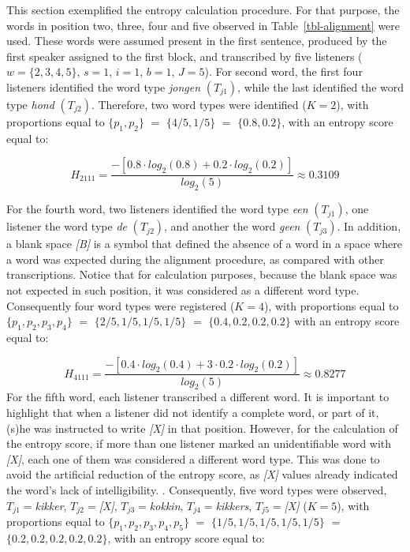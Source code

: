 \documentclass[
  authoryear,
  preprint,
  1p]{elsarticle}
\begin{document}
This section exemplified the entropy calculation procedure. For that
purpose, the words in position two, three, four and five observed in
Table~\ref{tbl-alignment} were used. These words were assumed present in
the first sentence, produced by the first speaker assigned to the first
block, and transcribed by five listeners (\(w=\{2,3,4,5\}\), \(s=1\),
\(i=1\), \(b=1\), \(J=5\)). For second word, the first four listeners
identified the word type \emph{jongen} \((T_{j1})\), while the last
identified the word type \emph{hond} \((T_{j2})\). Therefore, two word
types were identified (\(K=2\)), with proportions equal to
\(\{ p_{1}, p_{2} \}\) \(=\) \(\{ 4/5, 1/5 \}\) \(=\)
\(\{ 0.8, 0.2 \}\), with an entropy score equal to:

\[ 
H_{2111} = \frac{ -\left[ 0.8 \cdot log_{2}(0.8) + 0.2 \cdot log_{2}(0.2) \right] }{ log_{2}(5)} \approx 0.3109
\]

For the fourth word, two listeners identified the word type \emph{een}
\((T_{j1})\), one listener the word type \emph{de} \((T_{j2})\), and
another the word \emph{geen} \((T_{j3})\). In addition, a blank space
\emph{{[}B{]}} is a symbol that defined the absence of a word in a space
where a word was expected during the alignment procedure, as compared
with other transcriptions. Notice that for calculation purposes, because
the blank space was not expected in such position, it was considered as
a different word type. Consequently four word types were registered
(\(K=4\)), with proportions equal to
\(\{ p_{1}, p_{2}, p_{3}, p_{4} \}\) \(=\) \(\{ 2/5, 1/5, 1/5, 1/5 \}\)
\(=\) \(\{ 0.4, 0.2, 0.2, 0.2 \}\) with an entropy score equal to:

\[ 
H_{4111} = \frac{ -\left[ 0.4 \cdot log_{2}(0.4) + 3 \cdot 0.2 \cdot log_{2}(0.2) \right] }{ log_{2}(5)} \approx 0.8277
\] For the fifth word, each listener transcribed a different word. It is
important to highlight that when a listener did not identify a complete
word, or part of it, (s)he was instructed to write \emph{{[}X{]}} in
that position. However, for the calculation of the entropy score, if
more than one listener marked an unidentifiable word with
\emph{{[}X{]}}, each one of them was considered a different word type.
This was done to avoid the artificial reduction of the entropy score, as
\emph{{[}X{]}} values already indicated the word's lack of
intelligibility. . Consequently, five word types were observed,
\(T_{j1}=\)\emph{kikker}, \(T_{j2}=\)\emph{{[}X{]}},
\(T_{j3}=\)\emph{kokkin}, \(T_{j4}=\)\emph{kikkers},
\(T_{j5}=\)\emph{{[}X{]}} (\(K=5\)), with proportions equal to
\(\{ p_{1}, p_{2}, p_{3}, p_{4}, p_{5} \}\) \(=\)
\(\{ 1/5, 1/5, 1/5, 1/5, 1/5 \}\) \(=\)
\(\{ 0.2, 0.2, 0.2, 0.2, 0.2 \}\), with an entropy score equal to:
\end{document}
